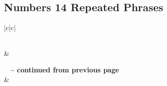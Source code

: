 \subsection{Numbers 14 Repeated Phrases}


\normalsize
 
\begin{center}
\begin{longtable}{|c|c|}
\caption[Numbers 14 Repeated Phrases]{Numbers 14 Repeated Phrases}\label{table:Repeated Phrases Numbers 14} \\
\hline {} &  \\ \hline 
\endfirsthead
 
{{\bfseries \tablename\ \thetable{} -- continued from previous page}} \\  
\hline {} &  \\ \hline 
\endhead
 

\end{longtable}
\end{center}
